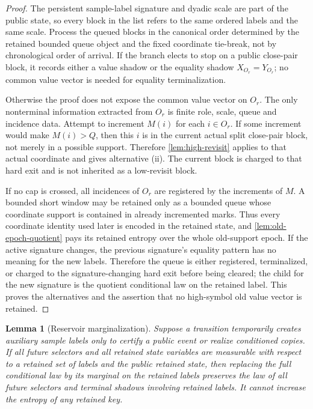 \documentclass[11pt]{article}
\newcommand{\Cref}[1]{\ref{#1}}
\newtheorem{lemma}[theorem]{Lemma}
\theoremstyle{remark}
\begin{document}
\begin{proof}
The persistent sample-label signature and dyadic scale are part of the public state, so every block in the list refers to the same ordered labels and the same scale.  Process the queued blocks in the canonical order determined by the retained bounded queue object and the fixed coordinate tie-break, not by chronological order of arrival.  If the branch elects to stop on a public close-pair block, it records either a value shadow or the equality shadow $X_{O_r}=Y_{O_r}$; no common value vector is needed for equality terminalization.

Otherwise the proof does not expose the common value vector on $O_r$.  The only nonterminal information extracted from $O_r$ is finite role, scale, queue and incidence data.  Attempt to increment $M(i)$ for each $i\in O_r$.  If some increment would make $M(i)>Q$, then this $i$ is in the current actual split close-pair block, not merely in a possible support.  Therefore \Cref{lem:high-revisit} applies to that actual coordinate and gives alternative (ii).  The current block is charged to that hard exit and is not inherited as a low-revisit block.

If no cap is crossed, all incidences of $O_r$ are registered by the increments of $M$.  A bounded short window may be retained only as a bounded queue whose coordinate support is contained in already incremented marks.  Thus every coordinate identity used later is encoded in the retained state, and \Cref{lem:old-epoch-quotient} pays its retained entropy over the whole old-support epoch.  If the active signature changes, the previous signature's equality pattern has no meaning for the new labels.  Therefore the queue is either registered, terminalized, or charged to the signature-changing hard exit before being cleared; the child for the new signature is the quotient conditional law on the retained label.  This proves the alternatives and the assertion that no high-symbol old value vector is retained.
\end{proof}


\begin{lemma}[Reservoir marginalization]\label{lem:reservoir-marg}
Suppose a transition temporarily creates auxiliary sample labels only to certify a public event or realize conditioned copies.  If all future selectors and all retained state variables are measurable with respect to a retained set of labels and the public retained state, then replacing the full conditional law by its marginal on the retained labels preserves the law of all future selectors and terminal shadows involving retained labels.  It cannot increase the entropy of any retained key.
\end{lemma}
\end{document}

